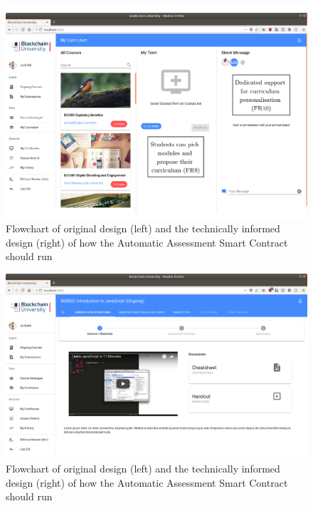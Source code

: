 \begin{figure}[!ht]
	\centering
	\includegraphics[width=1.0\textwidth]{Learner_customiser}
	\caption[Learner Application My Curriculum Page]
	{Flowchart of original design (left) and the technically informed design (right) of how the Automatic Assessment Smart Contract should run}
	\label{fig:Learner_customiser}
\end{figure}

\begin{figure}[!ht]
	\centering
	\includegraphics[width=1.0\textwidth]{Learner_ongoing1}
	\caption[Learner Application Example Ongoing Module Page]
	{Flowchart of original design (left) and the technically informed design (right) of how the Automatic Assessment Smart Contract should run}
	\label{fig:Learner_ongoing1}
\end{figure}

